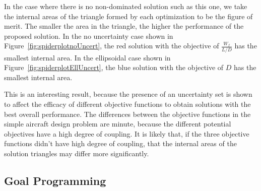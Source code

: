 In the case where there is no non-dominated solution such as this one,
we take the internal areas of the triangle formed by each optimization to be the figure of merit.
The smaller the area in the triangle, the higher the performance of the proposed solution.
In the no uncertainty case shown in Figure~\ref{fig:spiderplotnoUncert}, the red solution with the
objective of $\frac{W_f}{L/D}$ has the smallest internal area. In the ellipsoidal case shown in
Figure~\ref{fig:spiderplotEllUncert}, the blue solution with the objective of $D$ has the smallest internal area.

This is an interesting result, because the presence of an uncertainty set is
shown to affect the efficacy of different objective functions to obtain solutions
with the best overall performance. The differences between the objective functions
in the simple aircraft design problem are minute, because the different potential objectives
have a high degree of coupling. It is likely that, if the three objective functions didn't
have high degree of coupling, that the internal areas of the solution triangles may differ
more significantly.


\subsection{Goal Programming}


